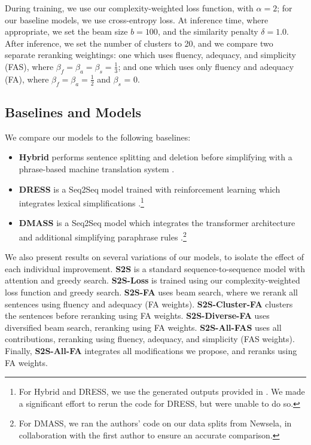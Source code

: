 \documentclass[11pt,a4paper]{article}
\begin{document}
During training, we use our complexity-weighted loss function, with $\alpha = 2$; for our baseline models, we use cross-entropy loss. At inference time, where appropriate, we set the beam size $b = 100$, and the similarity penalty $\delta = 1.0$. After inference, we set the number of clusters to 20, and we compare two separate reranking weightings: one which uses fluency, adequacy, and simplicity (FAS), where $\beta_f = \beta_a = \beta_s = \frac{1}{3}$; and one which uses only fluency and adequacy (FA), where $\beta_f = \beta_a = \frac{1}{2}$ and $\beta_s$ = 0.

\subsection{Baselines and Models}

We compare our models to the following baselines:

\begin{itemize}
    \item \textbf{Hybrid} performs sentence splitting and deletion before simplifying with a phrase-based machine translation system \cite{narayan2014hybrid}.
    \item \textbf{DRESS} is a Seq2Seq model trained with reinforcement learning which integrates lexical simplifications \cite{zhang2017sentence}.\footnote{For Hybrid and DRESS, we use the generated outputs provided in . We made a significant effort to rerun the code for DRESS, but were unable to do so.}
    \item \textbf{DMASS} is a Seq2Seq model which integrates the transformer architecture and additional simplifying paraphrase rules \cite{zhao2018integrating}.\footnote{For DMASS, we ran the authors' code on our data splits from Newsela, in collaboration with the first author to ensure an accurate comparison.}
\end{itemize}

We also present results on several variations of our models, to isolate the effect of each individual improvement.
\textbf{S2S} is a standard sequence-to-sequence model with attention and greedy search. \textbf{S2S-Loss} is trained using our complexity-weighted loss function and greedy search. \textbf{S2S-FA} uses beam search, where we rerank all sentences using fluency and adequacy (FA weights). \textbf{S2S-Cluster-FA}  clusters the sentences before reranking using FA weights. \textbf{S2S-Diverse-FA} uses diversified beam search, reranking using FA weights. \textbf{S2S-All-FAS} uses all contributions, reranking using fluency, adequacy, and simplicity (FAS weights). 
Finally, \textbf{S2S-All-FA} integrates all modifications we propose, and reranks using FA weights.
\end{document}
